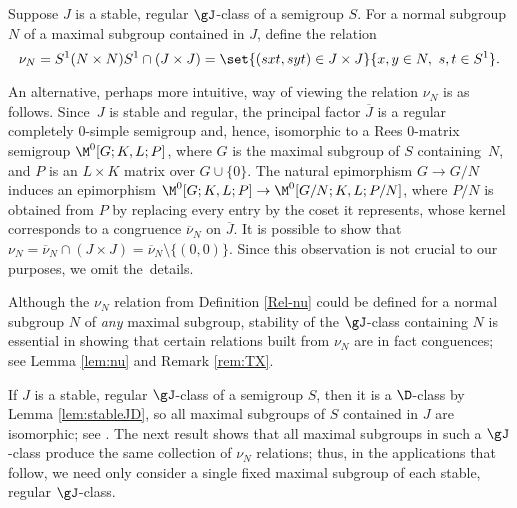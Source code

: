 \begin{definition}
\label{Rel-nu}
Suppose $J$ is a stable, regular $\gJ$-class of a semigroup $S$.  For a normal subgroup $N$ of a maximal subgroup contained in $J$, define the relation
\[
\nu_N = S^1(N\times N)S^1\cap(J\times J) = \set{ (sxt,syt)\in J\times J}{ x,y\in N,\ s,t\in S^1}.
\]
\end{definition}

An alternative, perhaps more intuitive, way of viewing the relation $\nu_N$ is
as follows.  
Since~$J$ is stable and regular, the principal factor $\overline{J}$ is a regular
completely $0$-simple semigroup and, hence, isomorphic to a Rees $0$-matrix
semigroup $\M^0[G;K,L; P]$, where $G$ is the maximal subgroup of $S$ containing~$N$, and $P$ is an $L\times K$ matrix over $G\cup\{0\}$.  The natural
epimorphism $G\rightarrow G/N$ induces an epimorphism ${\M^0[G;K,L;P]\rightarrow
\M^0[G/N;K,L;P/N]}$, where $P/N$ is obtained from $P$ by replacing every entry by
the coset it represents, whose kernel corresponds to a congruence
$\overline{\nu}_N$ on $\overline{J}$.  It is possible to show that
$\nu_N=\overline{\nu}_N\cap(J\times J)=\overline{\nu}_N\setminus\{(0,0)\}$.  Since this observation is not crucial to our purposes, we omit the~details.

Although the $\nu_N$ relation from Definition \ref{Rel-nu} could be defined for a normal subgroup $N$ of \emph{any} maximal subgroup, stability of the $\gJ$-class containing $N$ is essential in showing that certain relations built from $\nu_N$ are in fact conguences; see Lemma \ref{lem:nu} and Remark \ref{rem:TX}.

%
If $J$ is a stable, regular $\gJ$-class of a semigroup $S$, then it is a $\D$-class by Lemma \ref{lem:stableJD}, so all maximal subgroups of $S$ contained in $J$ are isomorphic; see \cite[Proposition 2.3.6]{Howie}.  The next result shows that all maximal subgroups in such a $\gJ$-class produce the same collection of $\nu_N$ relations; thus, in the applications that follow, we need only consider a single fixed maximal subgroup of each stable, regular $\gJ$-class.

